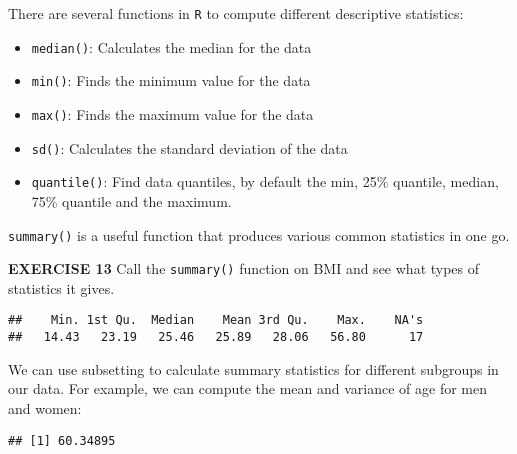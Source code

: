 \documentclass[
]{article}
\newenvironment{Shaded}{\begin{snugshade}}{\end{snugshade}}
\newcommand{\CommentTok}[1]{\textcolor[rgb]{0.56,0.35,0.01}{\textit{#1}}}
\newcommand{\KeywordTok}[1]{\textcolor[rgb]{0.13,0.29,0.53}{\textbf{#1}}}
\newcommand{\NormalTok}[1]{#1}
\newcommand{\OperatorTok}[1]{\textcolor[rgb]{0.81,0.36,0.00}{\textbf{#1}}}
\newcommand{\StringTok}[1]{\textcolor[rgb]{0.31,0.60,0.02}{#1}}
\providecommand{\tightlist}{%
  \setlength{\itemsep}{0pt}\setlength{\parskip}{0pt}}
\begin{document}
There are several functions in \texttt{R} to compute different
descriptive statistics:

\begin{itemize}
\tightlist
\item
  \texttt{median()}: Calculates the median for the data
\item
  \texttt{min()}: Finds the minimum value for the data
\item
  \texttt{max()}: Finds the maximum value for the data
\item
  \texttt{sd()}: Calculates the standard deviation of the data
\item
  \texttt{quantile()}: Find data quantiles, by default the min, 25\%
  quantile, median, 75\% quantile and the maximum.
\end{itemize}

\texttt{summary()} is a useful function that produces various common
statistics in one go.

\textbf{EXERCISE 13} Call the \texttt{summary()} function on BMI and see
what types of statistics it gives.

\begin{Shaded}
\end{Shaded}

\begin{verbatim}
##    Min. 1st Qu.  Median    Mean 3rd Qu.    Max.    NA's 
##   14.43   23.19   25.46   25.89   28.06   56.80      17
\end{verbatim}

We can use subsetting to calculate summary statistics for different
subgroups in our data. For example, we can compute the mean and variance
of age for men and women:

\begin{Shaded}
\end{Shaded}

\begin{verbatim}
## [1] 60.34895
\end{verbatim}
\end{document}

